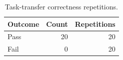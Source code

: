 \begin{table}[t]
\centering
\caption{Task-transfer correctness repetitions.}
\label{tab:correctness}
\begin{tabular}{lrr}
\toprule
Outcome & Count & Repetitions \\
\midrule
Pass & 20 & 20 \\
Fail & 0 & 20 \\
\bottomrule
\end{tabular}
\end{table}
